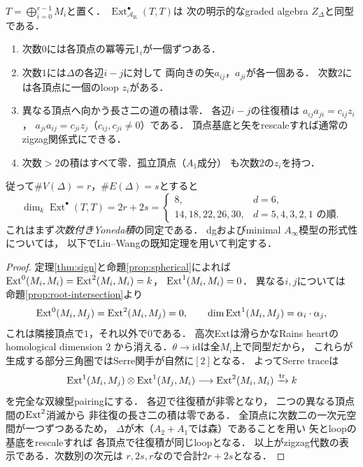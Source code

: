 \begin{theorem}
\label{thm:zigzag-ext}
$T=\bigoplus_{i=0}^{r-1}M_i$と置く．
$\operatorname{Ext}^{\bullet}_{\mathcal A_{\mathrm R}}(T,T)$は
次の明示的なgraded algebra $Z_\Delta$と同型である．
\begin{enumerate}
\item 次数$0$には各頂点の冪等元$1_i$が一個ずつある．
\item 次数$1$には$\Delta$の各辺$i-j$に対して
両向きの矢$a_{ij}$，$a_{ji}$が各一個ある．
次数$2$には各頂点に一個のloop $z_i$がある．
\item 異なる頂点へ向かう長さ二の道の積は零．
各辺$i-j$の往復積は
$a_{ij}a_{ji}=c_{ij}z_i$，
$a_{ji}a_{ij}=c_{ji}z_j$（$c_{ij},c_{ji}\ne0$）である．
頂点基底と矢をrescaleすれば通常のzigzag関係式にできる．
\item 次数$>2$の積はすべて零．孤立頂点（$A_1$成分）
も次数$2$の$z_i$を持つ．
\end{enumerate}
従って$\#V(\Delta)=r$，$\#E(\Delta)=s$とすると
\[
\dim_k\operatorname{Ext}^{\bullet}(T,T)=2r+2s
=\begin{cases}
8,&d=6,\\
14,18,22,26,30,&d=5,4,3,2,1\text{ の順}.
\end{cases}
\]
これはまず\emph{次数付きYoneda積}の同定である．
dgおよびminimal $A_\infty$模型の形式性については，
以下でLiu--Wangの既知定理を用いて判定する．
\end{theorem}
\begin{proof}
定理\ref{thm:sign}と命題\ref{prop:spherical}によれば
$\operatorname{Ext}^0(M_i,M_i)=\operatorname{Ext}^2(M_i,M_i)=k$，
$\operatorname{Ext}^1(M_i,M_i)=0$．
異なる$i,j$については
命題\ref{prop:root-intersection}より
\[
\operatorname{Ext}^0(M_i,M_j)=\operatorname{Ext}^2(M_i,M_j)=0,\qquad
\dim\operatorname{Ext}^1(M_i,M_j)=\alpha_i\cdot\alpha_j,
\]
これは隣接頂点で$1$，それ以外で$0$である．
高次Extは滑らかなRains heartのhomological dimension $2$
から消える．$\theta\to\mathrm{id}$は全$M_i$上で同型だから，
これらが生成する部分三角圏ではSerre関手が自然に$[2]$となる．
よってSerre traceは
\[
\operatorname{Ext}^1(M_i,M_j)\otimes\operatorname{Ext}^1(M_j,M_i)
\longrightarrow \operatorname{Ext}^2(M_i,M_i)\xrightarrow{\operatorname{tr}} k
\]
を完全な双線型pairingにする．
各辺で往復積が非零となり，
二つの異なる頂点間の$\operatorname{Ext}^2$消滅から
非往復の長さ二の積は零である．
全頂点に次数二の一次元空間が一つずつあるため，
$\Delta$が木（$A_2+A_1$では森）であることを用い
矢とloopの基底をrescaleすれば
各頂点で往復積が同じloopとなる．
以上がzigzag代数の表示である．次数別の次元は
$r,2s,r$なので合計$2r+2s$となる．
\end{proof}

